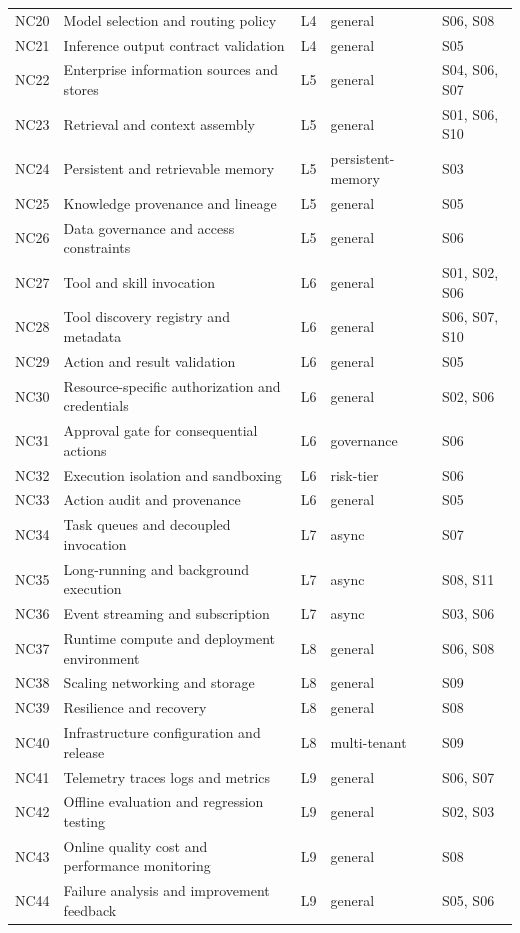 \begin{table}[t]
\begin{tabular}{p{} p{} p{} p{} p{}}
NC20 & Model selection and routing policy & L4 & general & S06, S08 \\
NC21 & Inference output contract validation & L4 & general & S05 \\
NC22 & Enterprise information sources and stores & L5 & general & S04, S06, S07 \\
NC23 & Retrieval and context assembly & L5 & general & S01, S06, S10 \\
NC24 & Persistent and retrievable memory & L5 & persistent-memory & S03 \\
NC25 & Knowledge provenance and lineage & L5 & general & S05 \\
NC26 & Data governance and access constraints & L5 & general & S06 \\
NC27 & Tool and skill invocation & L6 & general & S01, S02, S06 \\
NC28 & Tool discovery registry and metadata & L6 & general & S06, S07, S10 \\
NC29 & Action and result validation & L6 & general & S05 \\
NC30 & Resource-specific authorization and credentials & L6 & general & S02, S06 \\
NC31 & Approval gate for consequential actions & L6 & governance & S06 \\
NC32 & Execution isolation and sandboxing & L6 & risk-tier & S06 \\
NC33 & Action audit and provenance & L6 & general & S05 \\
NC34 & Task queues and decoupled invocation & L7 & async & S07 \\
NC35 & Long-running and background execution & L7 & async & S08, S11 \\
NC36 & Event streaming and subscription & L7 & async & S03, S06 \\
NC37 & Runtime compute and deployment environment & L8 & general & S06, S08 \\
NC38 & Scaling networking and storage & L8 & general & S09 \\
NC39 & Resilience and recovery & L8 & general & S08 \\
NC40 & Infrastructure configuration and release & L8 & multi-tenant & S09 \\
NC41 & Telemetry traces logs and metrics & L9 & general & S06, S07 \\
NC42 & Offline evaluation and regression testing & L9 & general & S02, S03 \\
NC43 & Online quality cost and performance monitoring & L9 & general & S08 \\
NC44 & Failure analysis and improvement feedback & L9 & general & S05, S06 \\
\hline
\end{tabular}
\end{table}

